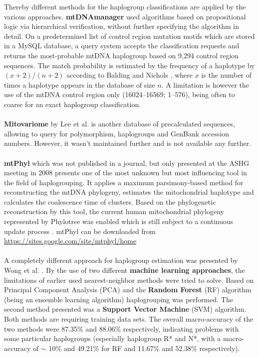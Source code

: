 Thereby different methods for the haplogroup classifications are applied by the various approaches. \textbf{mtDNAmanager} used algorithms based on propositional logic via hierarchical verification, without further specifying the algorithm in detail. On a predetermined list of control region mutation motifs which are stored in a MySQL database, a query system accepts the classification requests and returns the most-probable mtDNA haplogroup based on 9,294 control region sequences. The match probability is estimated by the frequency of a haplotype by $(x+2)/(n+2)$ according to Balding and Nichols \cite{Balding1994}, where $x$ is the number of times a haplotype appears in the database of size $n$. A limitation is however the use of the mtDNA control region only (16024–16569; 1–576), being often to coarse for an exact haplogroup classification.\\
\\
\textbf{Mitovariome} by Lee et al. \cite{Lee2009} is another database of precalculated sequences, allowing to query for polymorphism, haplogroups and GenBank accession numbers. However, it wasn't maintained further and is not available any further.\\
\\
\textbf{mtPhyl}\label{mtphyl} which was not published in a journal, but only presented at the ASHG meeting in 2008 presents one of the most unknown but most influencing tool in the field of haplogrouping. It applies a maximum parsimony-based method for reconstructing the mtDNA phylogeny, estimates the mitochondrial haplotype and calculates the coalescence time of clusters. Based on the phylogenetic reconstruction by this tool, the current human mitochondrial phylogeny represented by Phylotree was enabled which is still subject to a continuous update process \cite{VanOven2015}. mtPhyl can be downloaded from \url{https://sites.google.com/site/mtphyl/home}\\ 
\\
A completely different approach for haplogroup estimation was presented by Wong et al. \cite{Wong2011}. By the use of two different \textbf{machine learning approaches}, the limitations of earlier used nearest-neighbor methods were tried to solve. Based on Principal Component Analysis (PCA) and the\textbf{ Random Forest} (RF) algorithm (being an ensemble learning algorithm) haplogrouping was performed. The second method presented was a \textbf{Support Vector Machine} (SVM) algorithm. Both methods are requiring training data sets. The overall macro-accuracy of the two methods were 87.35\% and 88.06\% respectively, indicating problems with some particular haplogroups (especially haplogroup R* and N*, with a macro-accuracy of $\sim$ 10\% and 49.21\% for RF and 11.67\% and 52.38\% respectively). \\
